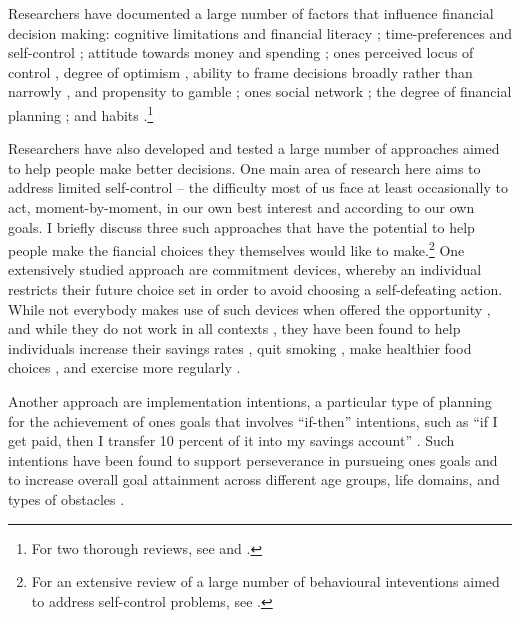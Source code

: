 Researchers have documented a large number of factors that influence financial
decision making: cognitive limitations and financial literacy
\citep{agarwal2009age, agarwal2013cognitive, korniotis2011older,
    agarwal2010learning, fernandes2014financial, jorring2020financial};
    time-preferences and self-control \citep{frederick2002time,
    read2018intertemporal, ericson2019intertemporal, cohen2020measuring};
    attitude towards money and spending \citep{rick2008tightwads,
    rick2011fatal}; ones perceived locus of control \citep{perry2005control},
    degree of optimism \citep{puri2007optimism}, ability to frame decisions
    broadly rather than narrowly \citep{kumar2008decision}, and propensity to
    gamble \citep{kumar2009gambles}; ones social network
    \citep{bailey2018economic, kuchler2021social}; the degree of financial
    planning \citep{ameriks2003wealth}; and habits
    \citep{blumenstock2018defaults, schaner2018persistent,
        de2013deposit}.\footnote{For two thorough reviews, see
    \citet{agarwal2017shapes} and \citet{greenberg2019financial}.}

Researchers have also developed and tested a large number of approaches aimed
to help people make better decisions. One main area of research here aims to
address limited self-control -- the difficulty most of us face at least
occasionally to act, moment-by-moment, in our own best interest and according
to our own goals. I briefly discuss three such approaches that have the
potential to help people make the fiancial choices they themselves would like
to make.\footnote{For an extensive review of a large number of behavioural
inteventions aimed to address self-control problems, see
\citet{duckworth2018beyond}.} One extensively studied approach are commitment
devices, whereby an individual restricts their future choice set in order to
avoid choosing a self-defeating action. While not everybody makes use of such
devices when offered the opportunity \citep{bryan2010commitment}, and while
they do not work in all contexts \citep{laibson2015don,robinson2018some}, they
have been found to help individuals increase their savings rates
\citep{ashraf2006tying}, quit smoking \citep{gine2010put}, make healthier food
choices \citep{schwartz2014healthier}, and exercise more regularly
\citep{royer2015incentives}.

Another approach are implementation intentions, a particular type of planning
for the achievement of ones goals that involves ``if-then'' intentions, such as
``if I get paid, then I transfer 10 percent of it into my savings account''
\citep{gollwitzer2006implementation, rogers2015beyond}. Such intentions have
been found to support perseverance in pursueing ones goals
\citep{oettingen2010strategies} and to increase overall goal attainment across
different age groups, life domains, and types of obstacles
\citep{gollwitzer2006implementation}.

